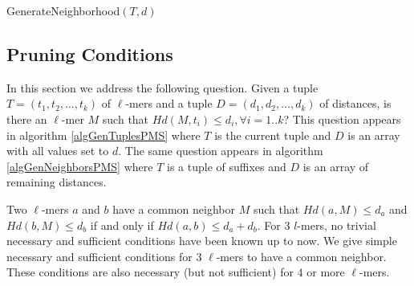 \begin{algorithm}

\caption{GenerateNeighborhood$(T,d)$}\label{algGenNeighborsPMS}
\end{algorithm}

\subsection{Pruning Conditions}
\label{sec_pms_pruning}
In this section we address the following question.
Given a tuple $T=(t_1,t_2,\ldots,t_k)$ of $\ell$-mers and a tuple
$D=(d_1,d_2,\ldots,d_k)$  of distances, is there an $\ell$-mer $M$ such that
$Hd(M,t_i)\leq d_i, \forall i=1..k$? This question appears in algorithm
\ref{algGenTuplesPMS} where $T$ is the current tuple and $D$ is an
array with all values set to $d$. The same question appears in
algorithm \ref{algGenNeighborsPMS} where $T$ is a tuple of suffixes and $D$ is an array
of remaining distances.

Two $\ell$-mers  $a$ and $b$ have a common neighbor $M$ such that $Hd(a,M)\leq
d_a$ and $Hd(b,M)\leq d_b$ if and only if $Hd(a,b)\leq d_a+d_b$.  For $3$
$l$-mers, no trivial necessary and sufficient conditions have been known up to now. We give simple
necessary and sufficient conditions for 3 $\ell$-mers to have
a common neighbor. These conditions are also necessary (but not sufficient) for
$4$ or more $\ell$-mers.

